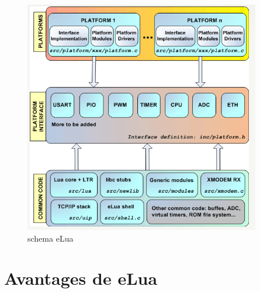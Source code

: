 \begin{figure}[h]
\begin{center}
\includegraphics[scale=0.4]{figure/eLua/schema.png}
\caption{schema eLua}
\end{center}
\end{figure}

\section{Avantages de eLua}

